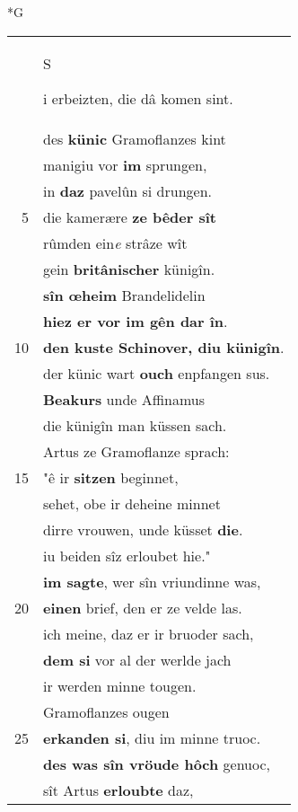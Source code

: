\documentclass[8pt,a4paper,notitlepage]{article}
\begin{document}
\newpage
\begin{table}[ht]
\begin{minipage}[t]{0.5\linewidth}
\small
\begin{center}*G
\end{center}
\begin{tabular}{rl}
 & \begin{large}S\end{large}i erbeizten, die dâ komen sint.\\ 
 & des \textbf{künic} Gramoflanzes kint\\ 
 & manigiu vor \textbf{im} sprungen,\\ 
 & in \textbf{daz} pavelûn si drungen.\\ 
5 & die kamerære \textbf{ze bêder sît}\\ 
 & rûmden ein\textit{e} strâze wît\\ 
 & gein \textbf{britânischer} künigîn.\\ 
 & \textbf{sîn œheim} Brandelidelin\\ 
 & \textbf{hiez er vor im gên dar în}.\\ 
10 & \textbf{den kuste Schinover, diu künigîn}.\\ 
 & der künic wart \textbf{ouch} enpfangen sus.\\ 
 & \textbf{Beakurs} unde Affinamus\\ 
 & die künigîn man küssen sach.\\ 
 & Artus ze Gramoflanze sprach:\\ 
15 & "ê ir \textbf{sitzen} beginnet,\\ 
 & sehet, obe ir deheine minnet\\ 
 & dirre vrouwen, unde küsset \textbf{die}.\\ 
 & iu beiden sîz erloubet hie."\\ 
 & \textbf{im sagte}, wer sîn vriundinne was,\\ 
20 & \textbf{einen} brief, den er ze velde las.\\ 
 & ich meine, daz er ir bruoder sach,\\ 
 & \textbf{dem si} vor al der werlde jach\\ 
 & ir werden minne tougen.\\ 
 & Gramoflanzes ougen\\ 
25 & \textbf{erkanden si}, diu im minne truoc.\\ 
 & \textbf{des was sîn vröude hôch} genuoc,\\ 
 & sît Artus \textbf{erloubte} daz,\\ 

\end{tabular}
\end{minipage}
\end{table}
\end{document}
